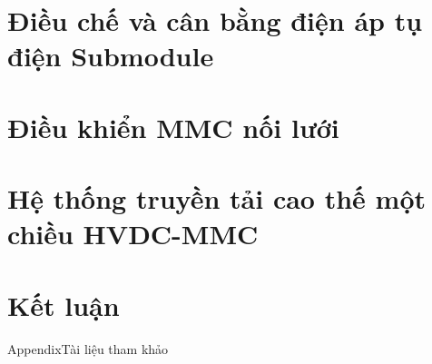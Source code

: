 \documentclass[aspectratio=169,t,10pt]{beamer} %
\begin{document}
\section{Điều chế và cân bằng điện áp tụ điện Submodule}
\section{Điều khiển MMC nối lưới}
\section{Hệ thống truyền tải cao thế một chiều HVDC-MMC}
\section{Kết luận}



\begin{hpcaappendixframe}{Appendix}{Tài liệu tham khảo}   %

 
 


\end{hpcaappendixframe}
\end{document}
